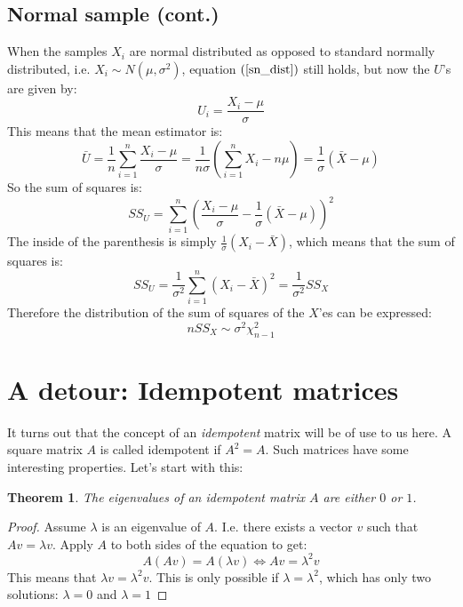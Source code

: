 \documentclass[12pt, a4paper]{article}
\newtheorem{theorem}{Theorem}
\begin{document}
\subsection{Normal sample (cont.)}
When the samples $X_i$ are normal distributed as opposed to standard normally distributed, i.e. $X_i\sim N(\mu,\sigma^2)$, equation $(\ref{sn_dist})$ still holds, but now the $U$'s are given by:
\begin{equation}
U_i=\frac{X_i-\mu}{\sigma}
\end{equation}
This means that the mean estimator is:
\begin{equation}
\bar{U}=\frac{1}{n}\sum_{i=1}^n\frac{X_i-\mu}{\sigma}=\frac{1}{n\sigma}\left(\sum_{i=1}^n X_i -n\mu\right)=\frac{1}{\sigma}\left(\bar{X}-\mu\right)
\end{equation}
So the sum of squares is:
\begin{equation}
SS_U=\sum_{i=1}^n\left(\frac{X_i-\mu}{\sigma}-\frac{1}{\sigma}\left(\bar{X}-\mu\right)\right)^2
\end{equation}
The inside of the parenthesis is simply $\frac{1}{\sigma}(X_i-\bar{X})$, which means that the sum of squares is:
\begin{equation}
SS_U=\frac{1}{\sigma^2}\sum_{i=1}^n(X_i-\bar{X})^2=\frac{1}{\sigma^2}SS_X
\end{equation}
Therefore the distribution of the sum of squares of the $X$'es can be expressed:
\begin{equation}
n SS_X\sim\sigma^2\chi^2_{n-1}
\end{equation}

\section{A detour: Idempotent matrices}
It turns out that the concept of an \textit{idempotent} matrix will be of use to us here. A square matrix $A$ is called idempotent if $A^2=A$. Such matrices have some interesting properties. Let's start with this:
\begin{theorem}
The eigenvalues of an idempotent matrix $A$ are either $0$ or $1$. 
\end{theorem}
\begin{proof}
\label{idem1}
Assume $\lambda$ is an eigenvalue of $A$. I.e. there exists a vector $v$ such that $Av=\lambda v$. Apply $A$ to both sides of the equation to get:
\begin{equation}
A(Av)=A(\lambda v)\Leftrightarrow Av=\lambda^2 v
\end{equation}
This means that $\lambda v=\lambda^2 v$. This is only possible if $\lambda=\lambda^2$, which has only two solutions: $\lambda=0$ and $\lambda=1$
\end{proof}
\end{document}
